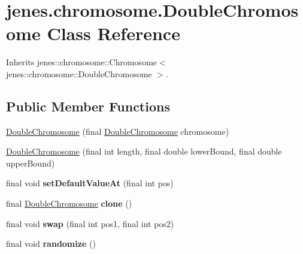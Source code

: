 \hypertarget{classjenes_1_1chromosome_1_1_double_chromosome}{
\section{jenes.chromosome.DoubleChromosome Class Reference}
\label{classjenes_1_1chromosome_1_1_double_chromosome}
}
Inherits jenes::chromosome::Chromosome$<$ jenes::chromosome::DoubleChromosome $>$.

\subsection*{Public Member Functions}
\begin{CompactItemize}
\item 
\hyperlink{classjenes_1_1chromosome_1_1_double_chromosome_849079d41a2f10db681ba24de10d2619}{DoubleChromosome} (final \hyperlink{classjenes_1_1chromosome_1_1_double_chromosome}{DoubleChromosome} chromosome)
\item 
\hyperlink{classjenes_1_1chromosome_1_1_double_chromosome_7166da8f71e5b0cf37e751c053f6ff5f}{DoubleChromosome} (final int length, final double lowerBound, final double upperBound)
\item 
\hypertarget{classjenes_1_1chromosome_1_1_double_chromosome_82130d84dadedda332121b92f801d2e6}{
final void \textbf{setDefaultValueAt} (final int pos)}
\label{classjenes_1_1chromosome_1_1_double_chromosome_82130d84dadedda332121b92f801d2e6}

\item 
\hypertarget{classjenes_1_1chromosome_1_1_double_chromosome_c471f6b6cb7989e6b90c5e70e7b8a9a2}{
final \hyperlink{classjenes_1_1chromosome_1_1_double_chromosome}{DoubleChromosome} \textbf{clone} ()}
\label{classjenes_1_1chromosome_1_1_double_chromosome_c471f6b6cb7989e6b90c5e70e7b8a9a2}

\item 
\hypertarget{classjenes_1_1chromosome_1_1_double_chromosome_c34343c04259b0e3da8a7b2579cbd5fc}{
final void \textbf{swap} (final int pos1, final int pos2)}
\label{classjenes_1_1chromosome_1_1_double_chromosome_c34343c04259b0e3da8a7b2579cbd5fc}

\item 
\hypertarget{classjenes_1_1chromosome_1_1_double_chromosome_1ecf9f1d70333b8cbabdba918946cdfc}{
final void \textbf{randomize} ()}
\label{classjenes_1_1chromosome_1_1_double_chromosome_1ecf9f1d70333b8cbabdba918946cdfc}


\end{CompactItemize}
